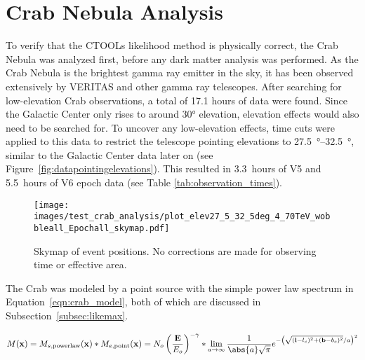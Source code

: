 \section{Crab Nebula Analysis}\label{sec:crab_analysis}
  To verify that the CTOOLs likelihood method is physically correct, the Crab Nebula was analyzed first, before any dark matter analysis was performed.
  As the Crab Nebula is the brightest gamma ray emitter in the sky, it has been observed extensively by VERITAS and other gamma ray telescopes.
  After searching for low-elevation Crab observations, a total of 17.1 hours of data were found.
  Since the Galactic Center only rises to around \ang{30} elevation, elevation effects would also need to be searched for.
  To uncover any low-elevation effects, time cuts were applied to this data to restrict the telescope pointing elevations to \SIrange{27.5}{32.5}{\degree}, similar to the Galactic Center data later on (see Figure~\ref{fig:datapointingelevations}).
  This resulted in \SI{3.3}{hours} of V5 and \SI{5.5}{hours} of V6 epoch data (see Table \ref{tab:observation_times}).
    
  \begin{figure}[h]
    \centering
    \texttt{[image: images/test\_crab\_analysis/plot\_elev27\_5\_32\_5deg\_4\_70TeV\_wobbleall\_Epochall\_skymap.pdf]}
    \caption[Crab Counts Skymap]
    {
      Skymap of event positions.
      No corrections are made for observing time or effective area.
    }
    \label{fig:crab_skymap}
  \end{figure}
  
  The Crab was modeled by a point source with the simple power law spectrum in Equation~\ref{eqn:crab_model}, both of which are discussed in Subsection~\ref{subsec:likemax}.

  \begin{equation}\label{eqn:crab_model}
    M(\xtrue) = M_{s,\textrm{powerlaw}}(\xtrue) * M_{e,\textrm{point}}(\xtrue) = N_o \left ( \frac{\Etrue}{E_o} \right )^{-\gamma} * \lim_{a\to\infty} \frac{1}{ \abs{a} \sqrt{\pi} } e^{ - \left ( \sqrt{ (\ltrue-l_c)^2 + (\btrue-b_c)^2 }/a \right )^2 }
  \end{equation}

